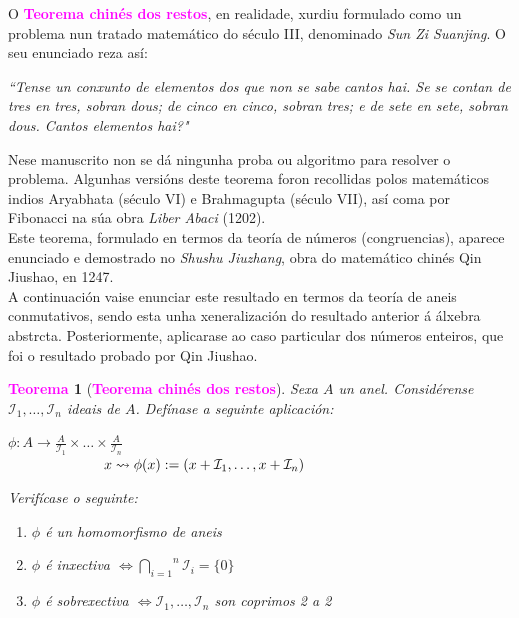 \documentclass[twoside]{report}
\newcommand{\magbf}[1]{\textcolor{magenta}{\textbf{#1}}} %
\theoremstyle{mystyle}
\newtheorem{theo}{\magbf{Teorema}}[chapter]
\newenvironment{theorem}
{\begin{mdframed}[linecolor = magenta,backgroundcolor = classicrose, linewidth = 2mm]\begin{theo}}
{\end{theo}\end{mdframed}}
\begin{document}
\vspace{5mm}

\noindent O \magbf{Teorema chinés dos restos}, en realidade, xurdiu formulado como un problema nun tratado matemático do século III, denominado \textit{Sun Zi Suanjing}. O seu enunciado reza así:\\

\begin{mdframed}[linecolor = magenta]
    \textit{``Tense un conxunto de elementos dos que non se sabe cantos hai. Se se contan de tres en tres, sobran dous; de cinco en cinco, sobran tres; e de sete en sete, sobran dous. Cantos elementos hai?"}
\end{mdframed}

\noindent Nese manuscrito non se dá ningunha proba ou algoritmo para resolver o problema. Algunhas versións deste teorema foron recollidas polos matemáticos indios Aryabhata (século VI) e Brahmagupta (século VII), así coma por Fibonacci na súa obra \textit{Liber Abaci} (1202).\\

\noindent Este teorema, formulado en termos da teoría de números (congruencias), aparece enunciado e demostrado no \textit{Shushu Jiuzhang}, obra do matemático chinés Qin Jiushao, en 1247.\\

\noindent A continuación vaise enunciar este resultado en termos da teoría de aneis conmutativos, sendo esta unha xeneralización do resultado anterior á álxebra abstrcta. Posteriormente, aplicarase ao caso particular dos números enteiros, que foi o resultado probado por Qin Jiushao.\\

\begin{theorem}[\magbf{Teorema chinés dos restos}] \label{th2.5}
Sexa $A$ un anel. Considérense $\mathcal{I}_{1}, \ldots, \mathcal{I}_{n}$ ideais de $A$.
\noindent Defínase a seguinte aplicación: 
    \begin{center}
            $\phi: A \longrightarrow \displaystyle \frac{A}{\mathcal{I}_{1}} \times \ldots \times \displaystyle \frac{A}{\mathcal{I}_{n}}$ \\
        \vspace{2mm}
        $\hspace{24mm} x \leadsto \phi(x) := (x + \mathcal{I}_{1}, \ldots, x + \mathcal{I}_{n})$
    \end{center} 
\noindent Verifícase o seguinte:
\begin{enumerate}
    \item $\phi$ é un homomorfismo de aneis
    \item $\phi$ é inxectiva $\Longleftrightarrow \overset{n}{\underset{i = 1}{\bigcap}}\mathcal{I}_{i} = \{0\}$
    \item $\phi$ é sobrexectiva $\Longleftrightarrow \mathcal{I}_{1}, \ldots, \mathcal{I}_{n}$ son coprimos 2 a 2 
\end{enumerate}
\end{theorem}
\end{document}
